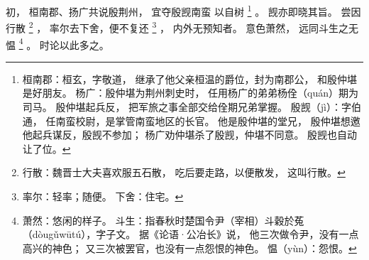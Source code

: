 
\switchcolumn*[\section{}]

初，
桓南郡、扬广共说殷荆州，
宜夺殷觊南蛮
以自树%
\footnote{%
    桓南郡：桓玄，字敬道，
            继承了他父亲桓温的爵位，封为南郡公，
            和殷仲堪是好朋友。
    杨广：殷仲堪为荆州刺史时，
          任用杨广的弟弟杨佺（quán）期为司马。
          殷仲堪起兵反，
          把军旅之事全部交给佺期兄弟掌握。
    殷觊（jì）：字伯通，
                任南蛮校尉，是掌管南蛮地区的长官。
                他是殷仲堪的堂兄，
                殷仲堪想邀他起兵谋反，殷觊不参加；
                杨广劝仲堪杀了殷觊，仲堪不同意。
                殷觊也自动让了位。
}%
。
觊亦即晓其旨。
尝因行散%
\footnote{%
    行散：魏晋士大夫喜欢服五石散，
          吃后要走路，以便散发，
          这叫行散。
}%
，
率尔去下舍，便不复还%
\footnote{%
    率尔：轻率；随便。
    下舍：住宅。
}%
，
内外无预知者。
意色萧然，
远同斗生之无愠%
\footnote{%
    萧然：悠闲的样子。
    斗生：指春秋时楚国令尹（宰相）斗穀於菟（dòugǔwūtú），字子文。
          据《论语·公冶长》说，
          他三次做令尹，没有一点高兴的神色；
          又三次被罢官，也没有一点怨恨的神色。
    愠（yùn）：怨恨。
}%
。
时论以此多之。

\switchcolumn



